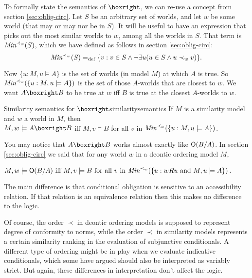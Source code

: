 To formally state the semantics of $\boxright$, we can re-use a concept from
section \ref{sec:oblig-circ}. Let $S$ be an arbitrary set of worlds, and let $w$
be some world (that may or may nor be in $S$). It will be useful to have an
expression that picks out the most similar worlds to $w$, among all the worlds in
$S$. That term is $\emph{Min}^{\prec_w}(S)$, which we have defined as follows in
section \ref{sec:oblig-circ}:
\[
  \emph{Min}^{\prec_w}(S) =_\text{def} \{ v: v \in S \land \neg\exists u (u \in S \land u \prec_w v) \}.
\]

Now $\{ u : M,u\models A \}$ is the set of worlds (in model $M$) at which $A$ is
true. So $\emph{Min}^{\prec_w}(\{ u : M,u\models A \})$ is the set of those
$A$-worlds that are closest to $w$. We want $A \boxright B$ to be true at $w$
iff $B$ is true at the closest $A$-worlds to $w$.

\begin{definition}{Similarity semantics for $\boxright$}{similaritysemantics}
  If $M$ is a similarity model and $w$ a world in $M$, then\\[1mm]
  $M,w \models A \boxright B$ iff $M,v \models B$ for all
  $v$ in $\emph{Min}^{\prec_w}(\{ u: M,u \models A \})$.
\end{definition}

You may notice that $A \boxright B$ works almost exactly like $\operatorname{\mathsf{O}}(B/A)$. In
section \ref{sec:oblig-circ} we said that for any world $w$ in a deontic
ordering model $M$,

\medskip
\quad$M,w \models \operatorname{\mathsf{O}} (B/A) \text{ iff } M,v \models B\text{ for all $v$ in $\emph{Min}^{\prec_w}(\{ u: wRu $ and $M,u\models A \})$}$.

\medskip \noindent%
The main difference is that conditional obligation is sensitive to an
accessibility relation. If that relation is an equivalence relation then this
makes no difference to the logic.


Of course, the order $\prec$ in deontic ordering models is supposed to represent
degree of conformity to norms, while the order $\prec$ in similarity models
represents a certain similarity ranking in the evaluation of subjunctive
conditionals. A different type of ordering might be in play when we evaluate
indicative conditionals, which some have argued should also be interpreted as
variably strict. But again, these differences in interpretation don't affect the
logic.

